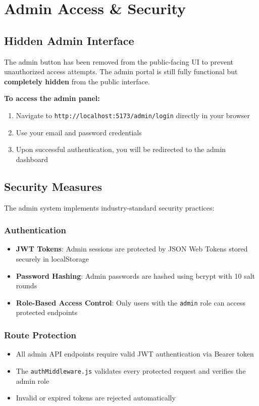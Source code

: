 \documentclass[12pt]{article}
\begin{document}
\section{Admin Access \& Security}

\subsection{Hidden Admin Interface}

The admin button has been removed from the public-facing UI to prevent unauthorized access attempts. The admin portal is still fully functional but \textbf{completely hidden} from the public interface.

\textbf{To access the admin panel:}
\begin{enumerate}
  \item Navigate to \texttt{http://localhost:5173/admin/login} directly in your browser
  \item Use your email and password credentials
  \item Upon successful authentication, you will be redirected to the admin dashboard
\end{enumerate}

\subsection{Security Measures}

The admin system implements industry-standard security practices:

\subsubsection{Authentication}
\begin{itemize}
  \item \textbf{JWT Tokens}: Admin sessions are protected by JSON Web Tokens stored securely in localStorage
  \item \textbf{Password Hashing}: Admin passwords are hashed using bcrypt with 10 salt rounds
  \item \textbf{Role-Based Access Control}: Only users with the \texttt{admin} role can access protected endpoints
\end{itemize}

\subsubsection{Route Protection}
\begin{itemize}
  \item All admin API endpoints require valid JWT authentication via Bearer token
  \item The \texttt{authMiddleware.js} validates every protected request and verifies the admin role
  \item Invalid or expired tokens are rejected automatically
\end{itemize}
\end{document}
